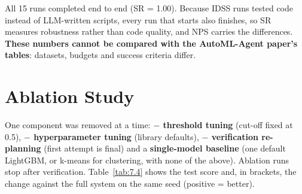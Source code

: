All 15 runs completed end to end (SR = 1.00). Because IDSS runs tested code instead of LLM-written scripts, every run that starts also finishes, so SR measures robustness rather than code quality, and NPS carries the differences. \textbf{These numbers cannot be compared with the AutoML-Agent paper's tables}: datasets, budgets and success criteria differ.

\FloatBarrier
\section{Ablation Study}\label{sec:7.4}

One component was removed at a time: \textbf{\ensuremath{-} threshold tuning} (cut-off fixed at 0.5), \textbf{\ensuremath{-} hyperparameter tuning} (library defaults), \textbf{\ensuremath{-} verification re-planning} (first attempt is final) and a \textbf{single-model baseline} (one default LightGBM, or k-means for clustering, with none of the above). Ablation runs stop after verification. Table~\ref{tab:7.4} shows the test score and, in brackets, the change against the full system on the same seed (positive = better).

